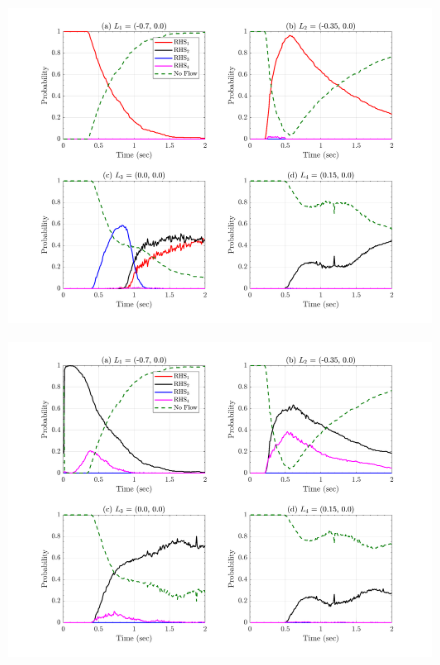 \documentclass{article}
\begin{document}
\begin{figure}[H]
        \centering
        \includegraphics[width=1\textwidth]{InclinedPlane/Dominance1/DominanceVX.png}
        \caption{}
        \label{fig:Ramp-FDominance1-VX}
\end{figure}

\begin{figure}[H]
        \centering
        \includegraphics[width=1\textwidth]{InclinedPlane/Dominance1/DominanceVY.png}
        \caption{}
        \label{fig:Ramp-FDominance1-VY}
\end{figure}
\end{document}
